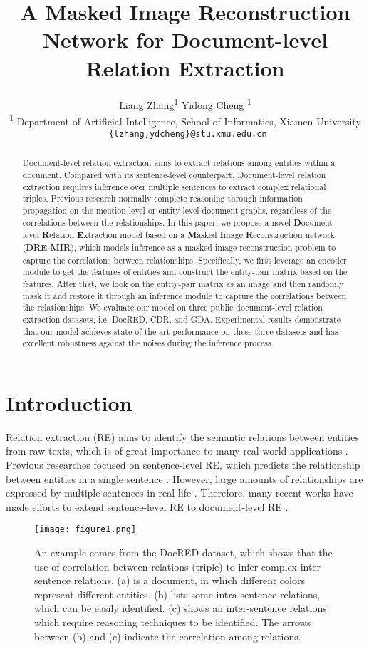 \documentclass{article}
\title{A Masked Image Reconstruction Network for Document-level Relation Extraction}
\author {
Liang Zhang\textsuperscript{\rm 1} 
    Yidong Cheng \textsuperscript{\rm 1}\\
    \textsuperscript{\rm 1} Department of Artificial Intelligence, School of Informatics, Xiamen University\\
    \texttt{ \{lzhang,ydcheng\}@stu.xmu.edu.cn} \\
}
\begin{document}
\maketitle

\begin{abstract}
Document-level relation extraction aims to extract relations among entities within a document. 
Compared with its sentence-level counterpart, Document-level relation extraction requires inference over multiple sentences to extract complex relational triples. 
Previous research normally complete reasoning through information propagation on the mention-level or entity-level document-graphs, regardless of the correlations between the relationships. 
In this paper, we propose a novel \textbf{D}ocument-level \textbf{R}elation \textbf{E}xtraction model based on a \textbf{M}asked \textbf{I}mage \textbf{R}econstruction network (\textbf{DRE-MIR}), which models inference as a masked image reconstruction problem to capture the correlations between relationships. 
Specifically, we first leverage an encoder module to get the features of entities and construct the entity-pair matrix based on the features. 
After that, we look on the entity-pair matrix as an image and then randomly mask it and restore it through an inference module to capture the correlations between the relationships. 
We evaluate our model on three public document-level relation extraction datasets, i.e. DocRED, CDR, and GDA. 
Experimental results demonstrate that our model achieves state-of-the-art performance on these three datasets and has excellent robustness against the noises during the inference process.

\end{abstract}

\section{Introduction}
Relation extraction (RE) aims to identify the semantic relations between entities from raw texts, which is of great importance to many real-world applications \cite{c:1,c:2,c:3}.
Previous researches focused on sentence-level RE, which predicts the relationship between entities in a single sentence \cite{c:5,c:4,c:7}. However, large amounts of relationships are expressed by multiple sentences in real life \cite{c:8,c:9}.
Therefore, many recent works have made efforts to extend sentence-level RE to document-level RE \cite{c:8,c:10,c:11,c:12,c:13}.

\begin{figure}[t]
\centering
\texttt{[image: figure1.png]} \caption{An example comes from the DocRED dataset, which shows that the use of correlation between relations (triple) to infer complex inter-sentence relations. (a) is a document, in which different colors represent different entities. (b) lists some intra-sentence relations, which can be easily identified. (c) shows an  inter-sentence relations which require reasoning techniques to be identified. The arrows between (b) and (c) indicate the correlation among relations.}
\label{fig1}
\end{figure}
\end{document}
